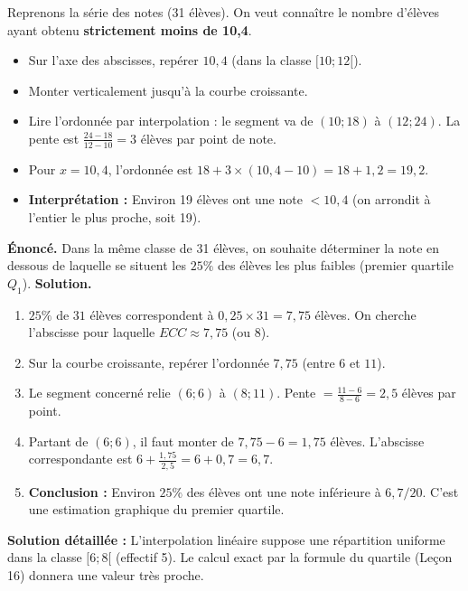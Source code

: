 \documentclass[11pt]{article}
\begin{document}
\begin{exemplebox}
Reprenons la série des notes (31 élèves). On veut connaître le nombre d'élèves ayant obtenu \textbf{strictement moins de 10,4}.
\begin{itemize}
\item Sur l'axe des abscisses, repérer $10,4$ (dans la classe $[10;12[$).
\item Monter verticalement jusqu'à la courbe croissante.
\item Lire l'ordonnée par interpolation : le segment va de $(10;18)$ à $(12;24)$. La pente est $\frac{24-18}{12-10} = 3$ élèves par point de note.
\item Pour $x = 10,4$, l'ordonnée est $18 + 3 \times (10,4 - 10) = 18 + 1,2 = 19,2$.
\item \textbf{Interprétation :} Environ 19 élèves ont une note $< 10,4$ (on arrondit à l'entier le plus proche, soit 19).
\end{itemize}
\end{exemplebox}

\begin{exoresolu}
\textbf{Énoncé.} Dans la même classe de 31 élèves, on souhaite déterminer la note en dessous de laquelle se situent les $25\%$ des élèves les plus faibles (premier quartile $Q_1$).
\textbf{Solution.}
\begin{enumerate}
\item $25\%$ de $31$ élèves correspondent à $0,25 \times 31 = 7,75$ élèves. On cherche l'abscisse pour laquelle $ECC \approx 7,75$ (ou $8$).
\item Sur la courbe croissante, repérer l'ordonnée $7,75$ (entre $6$ et $11$).
\item Le segment concerné relie $(6;6)$ à $(8;11)$. Pente $= \frac{11-6}{8-6} = 2,5$ élèves par point.
\item Partant de $(6;6)$, il faut monter de $7,75 - 6 = 1,75$ élèves. L'abscisse correspondante est $6 + \frac{1,75}{2,5} = 6 + 0,7 = 6,7$.
\item \textbf{Conclusion :} Environ $25\%$ des élèves ont une note inférieure à $6,7/20$. C'est une estimation graphique du premier quartile.
\end{enumerate}
\tcblower
\textbf{Solution détaillée :} L'interpolation linéaire suppose une répartition uniforme dans la classe $[6;8[$ (effectif 5). Le calcul exact par la formule du quartile (Leçon 16) donnera une valeur très proche.
\end{exoresolu}
\end{document}
